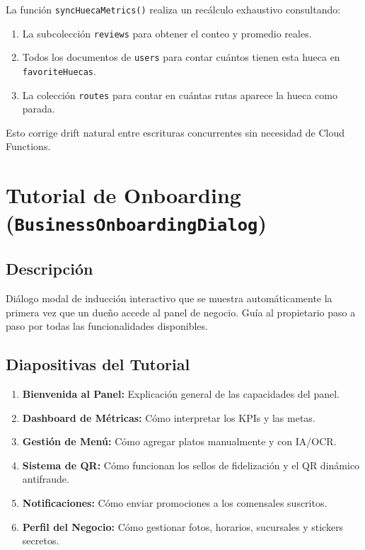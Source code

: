 \documentclass[11pt, a4paper, oneside]{report}
\begin{document}
\begin{techbox}
La función \texttt{syncHuecaMetrics()} realiza un recálculo exhaustivo consultando:
\begin{enumerate}
  \item La subcolección \texttt{reviews} para obtener el conteo y promedio reales.
  \item Todos los documentos de \texttt{users} para contar cuántos tienen esta hueca en \texttt{favoriteHuecas}.
  \item La colección \texttt{routes} para contar en cuántas rutas aparece la hueca como parada.
\end{enumerate}
Esto corrige drift natural entre escrituras concurrentes sin necesidad de Cloud Functions.
\end{techbox}

\section{Tutorial de Onboarding (\texttt{BusinessOnboardingDialog})}

\subsection{Descripción}
Diálogo modal de inducción interactivo que se muestra automáticamente la primera vez que un dueño accede al panel de negocio. Guía al propietario paso a paso por todas las funcionalidades disponibles.

\subsection{Diapositivas del Tutorial}
\begin{enumerate}
  \item \textbf{Bienvenida al Panel:} Explicación general de las capacidades del panel.
  \item \textbf{Dashboard de Métricas:} Cómo interpretar los KPIs y las metas.
  \item \textbf{Gestión de Menú:} Cómo agregar platos manualmente y con IA/OCR.
  \item \textbf{Sistema de QR:} Cómo funcionan los sellos de fidelización y el QR dinámico antifraude.
  \item \textbf{Notificaciones:} Cómo enviar promociones a los comensales suscritos.
  \item \textbf{Perfil del Negocio:} Cómo gestionar fotos, horarios, sucursales y stickers secretos.
\end{enumerate}
\end{document}
